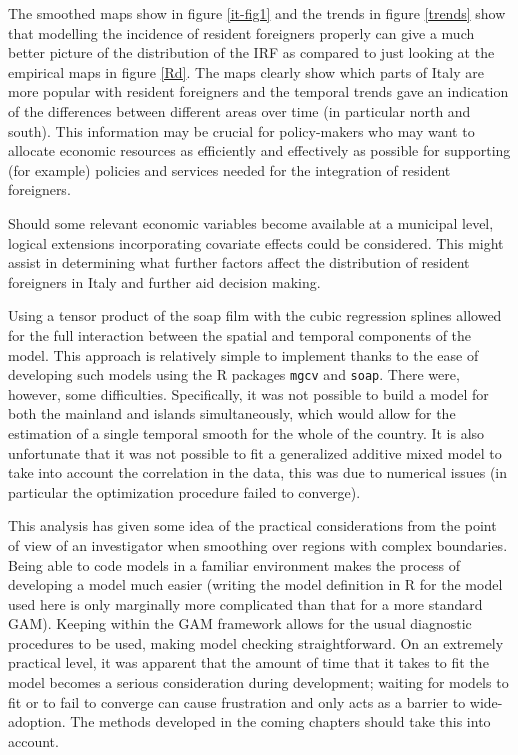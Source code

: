 The smoothed maps show in figure \ref{it-fig1} and the trends in figure \ref{trends} show that modelling the incidence of resident foreigners properly can give a much better picture of the distribution of the IRF as compared to just looking at the empirical maps in figure \ref{Rd}. The maps clearly show which parts of Italy are more popular with resident foreigners and the temporal trends gave an indication of the differences between different areas over time (in particular north and south). This information may be crucial for policy-makers who may want to allocate economic resources as efficiently and effectively as possible for supporting (for example) policies and services needed for the integration of resident foreigners.

Should some relevant economic variables become available at a municipal level, logical extensions incorporating covariate effects could be considered. This might assist in determining what further factors affect the distribution of resident foreigners in Italy and further aid decision making.

Using a tensor product of the soap film with the cubic regression splines allowed for the full interaction between the spatial and temporal components of the model. This approach is relatively simple to implement thanks to the ease of developing such models using the \textsf{R} packages \texttt{mgcv} and \texttt{soap}. There were, however, some difficulties. Specifically, it was not possible to build a model for both the mainland and islands simultaneously, which would allow for the estimation of a single temporal smooth for the whole of the country. It is also unfortunate that it was not possible to fit a generalized additive mixed model to take into account the correlation in the data, this was due to numerical issues (in particular the optimization procedure failed to converge).

This analysis has given some idea of the practical considerations from the point of view of an investigator when smoothing over regions with complex boundaries. Being able to code models in a familiar environment makes the process of developing a model much easier (writing the model definition in \textsf{R} for the model used here is only marginally more complicated than that for a more standard GAM). Keeping within the GAM framework allows for the usual diagnostic procedures to be used, making model checking straightforward. On an extremely practical level, it was apparent that the amount of time that it takes to fit the model becomes a serious consideration during development; waiting for models to fit or to fail to converge can cause frustration and only acts as a barrier to wide-adoption. The methods developed in the coming chapters should take this into account.


